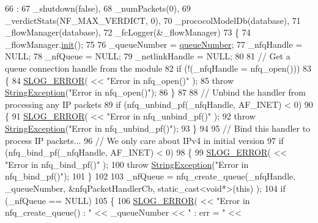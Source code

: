 \begin{DoxyCode}
66                                                                        :
67     \_shutdown(\textcolor{keyword}{false}),
68     \_numPackets(0),
69     \_verdictStats(NF\_MAX\_VERDICT, 0),
70     \_prococolModelDb(database),
71     \_flowManager(database),
72     \_fcLogger(&\_flowManager)
73 \{
74     \_flowManager.\hyperlink{class_vsid_common_1_1_flow_manager_a49fc9f26f20cb8b963dcf28a704f5861}{init}();
75 
76     \_queueNumber = \hyperlink{class_vsid_netfilter_1_1_packet_handler_a0ae07d1e28782fae0302f9e09e3dbf58}{queueNumber};
77     \_nfqHandle = NULL;
78     \_nfQueue = NULL;
79     \_netlinkHandle = NULL;
80 
81     \textcolor{comment}{// Get a queue connection handle from the module}
82     \textcolor{keywordflow}{if} (!(\_nfqHandle = nfq\_open())) 
83     \{
84         \hyperlink{_logger_8h_a2a8694cd392d18f4db6b9cc9f15bafe3}{SLOG\_ERROR}( << \textcolor{stringliteral}{"Error in nfq\_open()"} );
85         \textcolor{keywordflow}{throw} \hyperlink{class_vsid_common_1_1_string_exception}{StringException}(\textcolor{stringliteral}{"Error in nfq\_open()"});
86     \}
87 
88     \textcolor{comment}{// Unbind the handler from processing any IP packets}
89     \textcolor{keywordflow}{if} (nfq\_unbind\_pf(\_nfqHandle, AF\_INET) < 0) 
90     \{
91         \hyperlink{_logger_8h_a2a8694cd392d18f4db6b9cc9f15bafe3}{SLOG\_ERROR}( << \textcolor{stringliteral}{"Error in nfq\_unbind\_pf()"} );
92         \textcolor{keywordflow}{throw} \hyperlink{class_vsid_common_1_1_string_exception}{StringException}(\textcolor{stringliteral}{"Error in nfq\_unbind\_pf()"});
93     \}
94 
95     \textcolor{comment}{// Bind this handler to process IP packets...}
96     \textcolor{comment}{// We only care about IPv4 in initial version}
97     \textcolor{keywordflow}{if} (nfq\_bind\_pf(\_nfqHandle, AF\_INET) < 0) 
98     \{
99         \hyperlink{_logger_8h_a2a8694cd392d18f4db6b9cc9f15bafe3}{SLOG\_ERROR}( << \textcolor{stringliteral}{"Error in nfq\_bind\_pf()"} );
100         \textcolor{keywordflow}{throw} \hyperlink{class_vsid_common_1_1_string_exception}{StringException}(\textcolor{stringliteral}{"Error in nfq\_bind\_pf()"});
101     \}
102 
103     \_nfQueue = nfq\_create\_queue(\_nfqHandle, \_queueNumber, &nfqPacketHandlerCb, static\_cast<void*>(\textcolor{keyword}{this}) );
104     \textcolor{keywordflow}{if} (\_nfQueue == NULL) 
105     \{
106         \hyperlink{_logger_8h_a2a8694cd392d18f4db6b9cc9f15bafe3}{SLOG\_ERROR}( << \textcolor{stringliteral}{"Error in nfq\_create\_queue() : "} << \_queueNumber << \textcolor{stringliteral}{" : err = "} << 

\end{DoxyCode}
